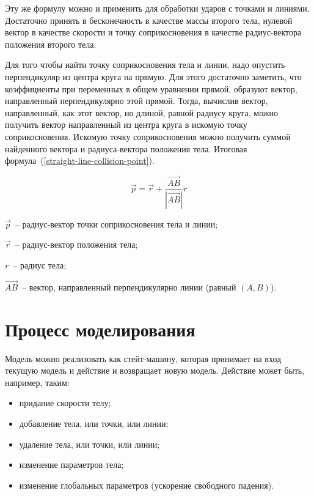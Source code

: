 Эту же формулу можно и применить для обработки ударов с точками и линиями. Достаточно принять в бесконечность в качестве массы второго тела,
нулевой вектор в качестве скорости и точку соприкосновения в качестве радиус-вектора положения второго тела.

Для того чтобы найти точку соприкосновения тела и линии, надо опустить перпендикуляр из центра круга на прямую.
Для этого достаточно заметить, что коэффициенты при переменных в общем уравнении прямой,
образуют вектор, направленный перпендикулярно этой прямой. Тогда, вычислив вектор, направленный, как этот вектор, но
длиной, равной радиусу круга, можно получить вектор направленный из центра круга в искомую точку соприкосновения.
Искомую точку соприкосновения можно получить суммой найденного вектора и радиуса-вектора положения тела.
Итоговая формула~(\ref{straight-line-collision-point}).

\begin{equation}\label{straight-line-collision-point}
  \vec{p} = \vec{r} + \frac{\vec{AB}}{\left|\vec{AB}\right|} r
\end{equation}

\begin{Underequation}
  \(\vec{p}\)~-- радиус-вектор точки соприкосновения тела и линии;

  \(\vec{r}\)~-- радиус-вектор положения тела;

  \(r\)~-- радиус тела;

  \(\vec{AB}\)~-- вектор, направленный перпендикулярно линии (равный \((A, B)\)).
\end{Underequation}

\section{Процесс моделирования}\label{statemachine_1}

Модель можно реализовать как стейт-машину, которая принимает на вход
текущую модель и действие и возвращает новую модель. Действие может быть, например, таким:

\begin{itemize}
  \item придание скорости телу;
  \item добавление тела, или точки, или линии;
  \item удаление тела, или точки, или линии;
  \item изменение параметров тела;
  \item изменение глобальных параметров (ускорение свободного падения).
\end{itemize}

